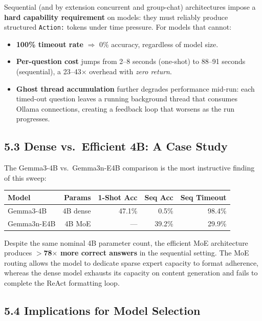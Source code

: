 \documentclass[11pt,letterpaper]{article}
\begin{document}
Sequential (and by extension concurrent and group-chat) architectures impose a \textbf{hard
capability requirement} on models: they must reliably produce structured \texttt{Action:}
tokens under time pressure. For models that cannot:

\begin{itemize}
  \item \textbf{100\% timeout rate} $\Rightarrow$ 0\% accuracy, regardless of model size.
  \item \textbf{Per-question cost} jumps from 2--8 seconds (one-shot) to 88--91 seconds
    (sequential), a 23--43$\times$ overhead with \emph{zero return}.
  \item \textbf{Ghost thread accumulation} further degrades performance mid-run: each timed-out
    question leaves a running background thread that consumes Ollama connections, creating a
    feedback loop that worsens as the run progresses.
\end{itemize}

\subsection*{5.3 Dense vs.\ Efficient 4B: A Case Study}

The Gemma3-4B vs.\ Gemma3n-E4B comparison is the most instructive finding of this sweep:

\begin{center}
\begin{tabular}{l r r r r}
\toprule
Model & Params & 1-Shot Acc & Seq Acc & Seq Timeout \\
\midrule
Gemma3-4B   & 4B dense & 47.1\% & 0.5\%  & 98.4\% \\
Gemma3n-E4B & 4B MoE   & ---    & 39.2\% & 29.9\% \\
\bottomrule
\end{tabular}
\end{center}

\noindent Despite the same nominal 4B parameter count, the efficient MoE architecture produces
\textbf{$>$78$\times$ more correct answers} in the sequential setting. The MoE routing allows
the model to dedicate sparse expert capacity to format adherence, whereas the dense model
exhausts its capacity on content generation and fails to complete the ReAct formatting loop.

\subsection*{5.4 Implications for Model Selection}
\end{document}
